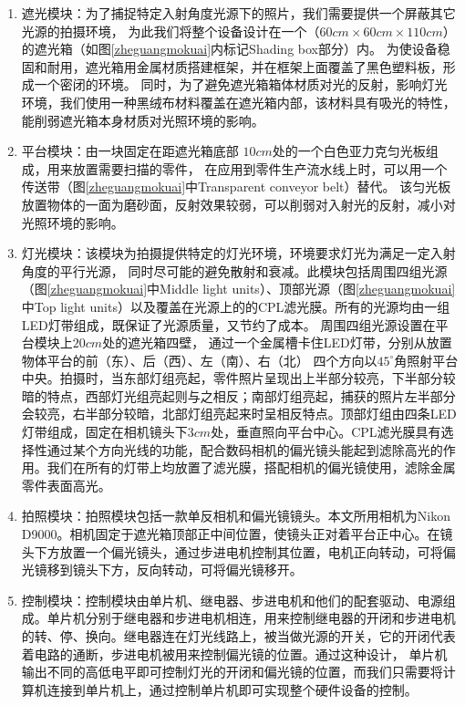\begin{enumerate}
\item 遮光模块：为了捕捉特定入射角度光源下的照片，我们需要提供一个屏蔽其它光源的拍摄环境，
为此我们将整个设备设计在一个（$60cm\times 60cm\times 110cm$）的遮光箱（如图\ref{zheguangmokuai}内标记Shading box部分）内。
为使设备稳固和耐用，遮光箱用金属材质搭建框架，并在框架上面覆盖了黑色塑料板，形成一个密闭的环境。
同时，为了避免遮光箱箱体材质对光的反射，影响灯光环境，我们使用一种黑绒布材料覆盖在遮光箱内部，该材料具有吸光的特性，能削弱遮光箱本身材质对光照环境的影响。
\item
平台模块：由一块固定在距遮光箱底部
$10cm$处的一个白色亚力克匀光板组成，用来放置需要扫描的零件，
在应用到零件生产流水线上时，可以用一个传送带（图\ref{zheguangmokuai}中Transparent conveyor belt）替代。
该匀光板放置物体的一面为磨砂面，反射效果较弱，可以削弱对入射光的反射，减小对光照环境的影响。
\item
灯光模块：该模块为拍摄提供特定的灯光环境，环境要求灯光为满足一定入射角度的平行光源，
同时尽可能的避免散射和衰减。此模块包括周围四组光源（图\ref{zheguangmokuai}中Middle light units）、顶部光源（图\ref{zheguangmokuai}中Top light units）以及覆盖在光源上的的CPL滤光膜。所有的光源均由一组LED灯带组成，既保证了光源质量，又节约了成本。
周围四组光源设置在平台模块上$20cm$处的遮光箱四壁，
通过一个金属槽卡住LED灯带，分别从放置物体平台的前（东）、后（西）、左（南）、右（北）
四个方向以${45}^{\circ}$角照射平台中央。拍摄时，当东部灯组亮起，零件照片呈现出上半部分较亮，下半部分较暗的特点，西部灯光组亮起则与之相反；南部灯组亮起，捕获的照片左半部分会较亮，右半部分较暗，北部灯组亮起来时呈相反特点。顶部灯组由四条LED灯带组成，固定在相机镜头下$3cm$处，垂直照向平台中心。CPL滤光膜具有选择性通过某个方向光线的功能，配合数码相机的偏光镜头能起到滤除高光的作用。我们在所有的灯带上均放置了滤光膜，搭配相机的偏光镜使用，滤除金属零件表面高光。
\item
拍照模块：拍照模块包括一款单反相机和偏光镜镜头。本文所用相机为Nikon D9000。相机固定于遮光箱顶部正中间位置，使镜头正对着平台正中心。在镜头下方放置一个偏光镜头，通过步进电机控制其位置，电机正向转动，可将偏光镜移到镜头下方，反向转动，可将偏光镜移开。
\item
控制模块：控制模块由单片机、继电器、步进电机和他们的配套驱动、电源组成。单片机分别于继电器和步进电机相连，用来控制继电器的开闭和步进电机的转、停、换向。继电器连在灯光线路上，被当做光源的开关，它的开闭代表着电路的通断，步进电机被用来控制偏光镜的位置。通过这种设计，
单片机输出不同的高低电平即可控制灯光的开闭和偏光镜的位置，而我们只需要将计算机连接到单片机上，通过控制单片机即可实现整个硬件设备的控制。
\end{enumerate}

